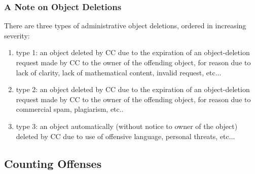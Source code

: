 \subsubsection*{A Note on Object Deletions}

There are three types of administrative object deletions, ordered in increasing severity:
\begin{enumerate}
\item type 1: an object deleted by CC due to the expiration of an object-deletion request made by CC to the owner of the offending object, for reason due to lack of clarity, lack of mathematical content, invalid request, etc...
\item type 2: an object deleted by CC due to the expiration of an object-deletion request made by CC to the owner of the offending object, for reason due to commercial spam, plagiarism, etc..
\item type 3: an object automatically (without notice to owner of the object) deleted by CC due to use of offensive language, personal threats, etc...
\end{enumerate}

\subsection*{Counting Offenses}

